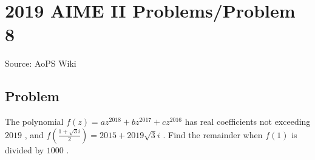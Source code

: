 \documentclass[12pt]{article}
\begin{document}
\section*{{2019 AIME II Problems/Problem 8}}
Source: AoPS Wiki

\subsection*{Problem}
The polynomial $f(z)=az^{2018}+bz^{2017}+cz^{2016}$ has real coefficients not exceeding $2019$ , and $f\left(\tfrac{1+\sqrt{3}i}{2}\right)=2015+2019\sqrt{3}i$ . Find the remainder when $f(1)$ is divided by $1000$ .
\end{document}
